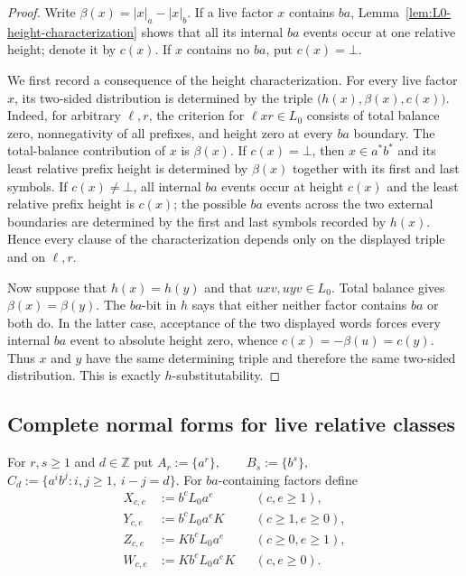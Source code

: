 \documentclass[11pt,a4paper]{article}
\begin{document}
\begin{proof}
Write $\beta(x)=|x|_a-|x|_b$.  If a live factor $x$ contains $ba$, Lemma~\ref{lem:L0-height-characterization} shows that all its internal $ba$ events occur at one relative height; denote it by $c(x)$.  If $x$ contains no $ba$, put $c(x)=\bot$.

We first record a consequence of the height characterization.  For every live factor $x$, its two-sided distribution is determined by the triple
\(\bigl(h(x),\beta(x),c(x)\bigr).\)
Indeed, for arbitrary $\ell,r$, the criterion for $\ell x r\in L_0$ consists of total balance zero, nonnegativity of all prefixes, and height zero at every $ba$ boundary.  The total-balance contribution of $x$ is $\beta(x)$.  If $c(x)=\bot$, then $x\in a^*b^*$ and its least relative prefix height is determined by $\beta(x)$ together with its first and last symbols.  If $c(x)\ne\bot$, all internal $ba$ events occur at height $c(x)$ and the least relative prefix height is $c(x)$; the possible $ba$ events across the two external boundaries are determined by the first and last symbols recorded by $h(x)$.  Hence every clause of the characterization depends only on the displayed triple and on $\ell,r$.

Now suppose that $h(x)=h(y)$ and that $uxv,uyv\in L_0$.  Total balance gives $\beta(x)=\beta(y)$.  The $ba$-bit in $h$ says that either neither factor contains $ba$ or both do.  In the latter case, acceptance of the two displayed words forces every internal $ba$ event to absolute height zero, whence
\(c(x)=-\beta(u)=c(y).\)
Thus $x$ and $y$ have the same determining triple and therefore the same two-sided distribution.  This is exactly $h$-substitutability.
\end{proof}

\subsection{Complete normal forms for live relative classes}

For $r,s\ge1$ and $d\in\mathbb Z$ put
\(A_r:=\{a^r\}, \qquad B_s:=\{b^s\},\)
\(C_d:=\{a^i b^j:i,j\ge1,\ i-j=d\}.\)
For $ba$-containing factors define
\begin{equation}
\begin{aligned}
  X_{c,e}&:=b^cL_0a^e && (c,e\ge1),\\
  Y_{c,e}&:=b^cL_0a^eK && (c\ge1,e\ge0),\\
  Z_{c,e}&:=Kb^cL_0a^e && (c\ge0,e\ge1),\\
  W_{c,e}&:=Kb^cL_0a^eK && (c,e\ge0).
\end{aligned}
\label{eq:L0-families}
\end{equation}
\end{document}
